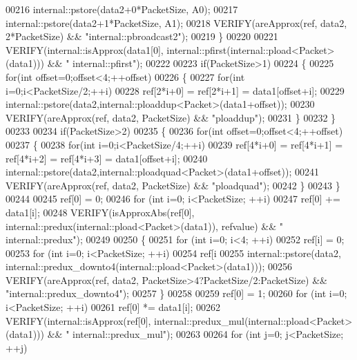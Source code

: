 \begin{DoxyCode}
00216     internal::pstore(data2+0*PacketSize, A0);
00217     internal::pstore(data2+1*PacketSize, A1);
00218     VERIFY(areApprox(ref, data2, 2*PacketSize) && \textcolor{stringliteral}{"internal::pbroadcast2"});
00219   \}
00220 
00221   VERIFY(internal::isApprox(data1[0], internal::pfirst(internal::pload<Packet>(data1))) && \textcolor{stringliteral}{"
      internal::pfirst"});
00222 
00223   \textcolor{keywordflow}{if}(PacketSize>1)
00224   \{
00225     \textcolor{keywordflow}{for}(\textcolor{keywordtype}{int} offset=0;offset<4;++offset)
00226     \{
00227       \textcolor{keywordflow}{for}(\textcolor{keywordtype}{int} i=0;i<PacketSize/2;++i)
00228         ref[2*i+0] = ref[2*i+1] = data1[offset+i];
00229       internal::pstore(data2,internal::ploaddup<Packet>(data1+offset));
00230       VERIFY(areApprox(ref, data2, PacketSize) && \textcolor{stringliteral}{"ploaddup"});
00231     \}
00232   \}
00233 
00234   \textcolor{keywordflow}{if}(PacketSize>2)
00235   \{
00236     \textcolor{keywordflow}{for}(\textcolor{keywordtype}{int} offset=0;offset<4;++offset)
00237     \{
00238       \textcolor{keywordflow}{for}(\textcolor{keywordtype}{int} i=0;i<PacketSize/4;++i)
00239         ref[4*i+0] = ref[4*i+1] = ref[4*i+2] = ref[4*i+3] = data1[offset+i];
00240       internal::pstore(data2,internal::ploadquad<Packet>(data1+offset));
00241       VERIFY(areApprox(ref, data2, PacketSize) && \textcolor{stringliteral}{"ploadquad"});
00242     \}
00243   \}
00244 
00245   ref[0] = 0;
00246   \textcolor{keywordflow}{for} (\textcolor{keywordtype}{int} i=0; i<PacketSize; ++i)
00247     ref[0] += data1[i];
00248   VERIFY(isApproxAbs(ref[0], internal::predux(internal::pload<Packet>(data1)), refvalue) && \textcolor{stringliteral}{"
      internal::predux"});
00249 
00250   \{
00251     \textcolor{keywordflow}{for} (\textcolor{keywordtype}{int} i=0; i<4; ++i)
00252       ref[i] = 0;
00253     \textcolor{keywordflow}{for} (\textcolor{keywordtype}{int} i=0; i<PacketSize; ++i)
00254       ref[i%
00255     internal::pstore(data2, internal::predux\_downto4(internal::pload<Packet>(data1)));
00256     VERIFY(areApprox(ref, data2, PacketSize>4?PacketSize/2:PacketSize) && \textcolor{stringliteral}{"internal::predux\_downto4"});
00257   \}
00258 
00259   ref[0] = 1;
00260   \textcolor{keywordflow}{for} (\textcolor{keywordtype}{int} i=0; i<PacketSize; ++i)
00261     ref[0] *= data1[i];
00262   VERIFY(internal::isApprox(ref[0], internal::predux\_mul(internal::pload<Packet>(data1))) && \textcolor{stringliteral}{"
      internal::predux\_mul"});
00263 
00264   \textcolor{keywordflow}{for} (\textcolor{keywordtype}{int} j=0; j<PacketSize; ++j)

\end{DoxyCode}
